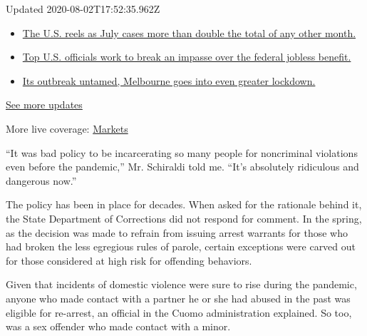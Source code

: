 Updated 2020-08-02T17:52:35.962Z

\begin{itemize}
\tightlist
\item
  \href{https://www.nytimes3xbfgragh.onion/2020/08/01/world/coronavirus-covid-19.html?action=click\&pgtype=Article\&state=default\&region=MAIN_CONTENT_1\&context=storylines_live_updates\#link-34047410}{The
  U.S. reels as July cases more than double the total of any other
  month.}
\item
  \href{https://www.nytimes3xbfgragh.onion/2020/08/01/world/coronavirus-covid-19.html?action=click\&pgtype=Article\&state=default\&region=MAIN_CONTENT_1\&context=storylines_live_updates\#link-780ec966}{Top
  U.S. officials work to break an impasse over the federal jobless
  benefit.}
\item
  \href{https://www.nytimes3xbfgragh.onion/2020/08/01/world/coronavirus-covid-19.html?action=click\&pgtype=Article\&state=default\&region=MAIN_CONTENT_1\&context=storylines_live_updates\#link-2bc8948}{Its
  outbreak untamed, Melbourne goes into even greater lockdown.}
\end{itemize}

\href{https://www.nytimes3xbfgragh.onion/2020/08/01/world/coronavirus-covid-19.html?action=click\&pgtype=Article\&state=default\&region=MAIN_CONTENT_1\&context=storylines_live_updates}{See
more updates}

More live coverage:
\href{https://www.nytimes3xbfgragh.onion/live/2020/07/31/business/stock-market-today-coronavirus?action=click\&pgtype=Article\&state=default\&region=MAIN_CONTENT_1\&context=storylines_live_updates}{Markets}

``It was bad policy to be incarcerating so many people for noncriminal
violations even before the pandemic,'' Mr. Schiraldi told me. ``It's
absolutely ridiculous and dangerous now.''

The policy has been in place for decades. When asked for the rationale
behind it, the State Department of Corrections did not respond for
comment. In the spring, as the decision was made to refrain from issuing
arrest warrants for those who had broken the less egregious rules of
parole, certain exceptions were carved out for those considered at high
risk for offending behaviors.

Given that incidents of domestic violence were sure to rise during the
pandemic, anyone who made contact with a partner he or she had abused in
the past was eligible for re-arrest, an official in the Cuomo
administration explained. So too, was a sex offender who made contact
with a minor.

